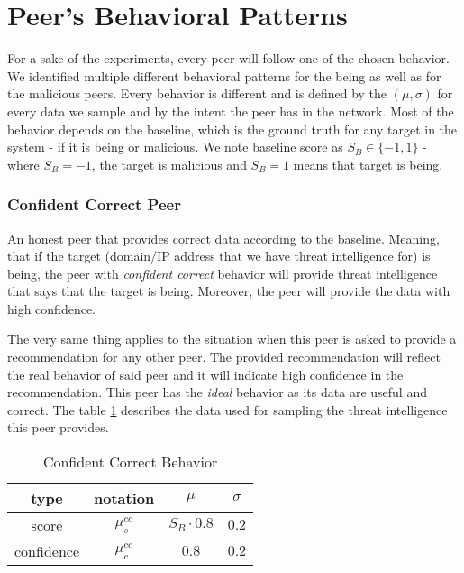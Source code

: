 \section{Peer's Behavioral Patterns}
\label{sec:peers-behavioral-patterns}
For a sake of the experiments, every peer will follow one of the chosen behavior.
We identified multiple different behavioral patterns for the being as well as for the malicious peers.
Every behavior is different and is defined by the $(\mu, \sigma)$ for every data we sample and by the intent the peer has in the network.
Most of the behavior depends on the baseline, which is the ground truth for any target in the system - if it is being or malicious.
We note baseline score as $S_{B} \in \{-1, 1\}$ - where $S_{B} = -1$, the target is malicious and $S_{B} = 1$ means that target is being.


\subsubsection{Confident Correct Peer}
\label{subsubsec:confident-correct-peer}
An honest peer that provides correct data according to the baseline. 
Meaning, that if the target (domain/IP address that we have threat intelligence for) is being, the peer with \textit{confident correct} behavior will provide threat intelligence that says that the target is being. 
Moreover, the peer will provide the data with high confidence.

The very same thing applies to the situation when this peer is asked to provide a recommendation for any other peer. 
The provided recommendation will reflect the real behavior of said peer and it will indicate high confidence in the recommendation.
This peer has the \textit{ideal} behavior as its data are useful and correct.
The table \ref{tab:confident-correct} describes the data used for sampling the threat intelligence this peer provides.

\begin{table}[!ht]
    \centering
    \begin{tabular}{c|c|c|c}
        type & notation & $\mu$ & $\sigma$ \\
        \hline
        score & $\mu^{cc}_{s}$ & $S_{B} \cdot 0.8$ & $0.2$ \\
        confidence & $\mu^{cc}_{c}$ &  $0.8$ & $0.2$ \\
    \end{tabular}
    \caption{Confident Correct Behavior}
    \label{tab:confident-correct}
\end{table}

